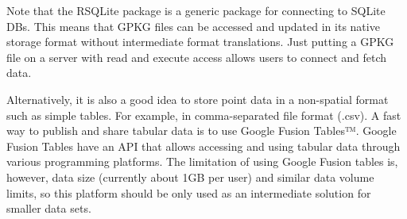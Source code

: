 \documentclass[10pt,b5paper,]{book}
\newenvironment{Shaded}{\begin{snugshade}}{\end{snugshade}}
\newcommand{\DataTypeTok}[1]{\textcolor[rgb]{0.13,0.29,0.53}{#1}}
\newcommand{\DecValTok}[1]{\textcolor[rgb]{0.00,0.00,0.81}{#1}}
\newcommand{\ErrorTok}[1]{\textcolor[rgb]{0.64,0.00,0.00}{\textbf{#1}}}
\newcommand{\KeywordTok}[1]{\textcolor[rgb]{0.13,0.29,0.53}{\textbf{#1}}}
\newcommand{\NormalTok}[1]{#1}
\newcommand{\OperatorTok}[1]{\textcolor[rgb]{0.81,0.36,0.00}{\textbf{#1}}}
\newcommand{\StringTok}[1]{\textcolor[rgb]{0.31,0.60,0.02}{#1}}
\theoremstyle{definition}
\theoremstyle{definition}
\theoremstyle{definition}
\theoremstyle{remark}
\begin{document}
\begin{Shaded}
\end{Shaded}

Note that the RSQLite package is a generic package for connecting to
SQLite DBs. This means that GPKG files can be accessed and updated in
its native storage format without intermediate format translations. Just
putting a GPKG file on a server with read and execute access allows
users to connect and fetch data.

Alternatively, it is also a good idea to store point data in a
non-spatial format such as simple tables. For example, in
comma-separated file format (.csv). A fast way to publish and share
tabular data is to use Google Fusion Tables™. Google Fusion Tables have
an API that allows accessing and using tabular data through various
programming platforms. The limitation of using Google Fusion tables is,
however, data size (currently about 1GB per user) and similar data
volume limits, so this platform should be only used as an intermediate
solution for smaller data sets.
\end{document}
